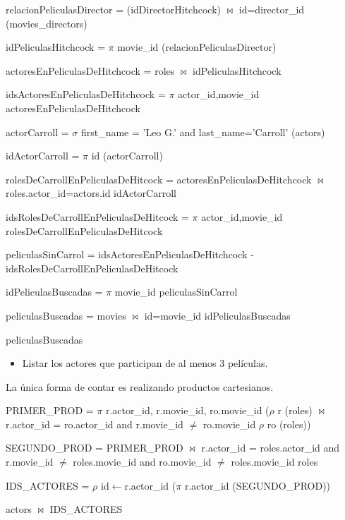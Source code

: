 relacionPeliculasDirector = (idDirectorHitchcock) $\bowtie$ id=director\_id (movies\_directors)

idPeliculasHitchcock = $\pi$ movie\_id (relacionPeliculasDirector)

actoresEnPeliculasDeHitchcock = roles $\bowtie$ idPeliculasHitchcock

idsActoresEnPeliculasDeHitchcock = $\pi$ actor\_id,movie\_id  actoresEnPeliculasDeHitchcock

actorCarroll = $\sigma$ first\_name = 'Leo G.' and last\_name='Carroll' (actors)

idActorCarroll = $\pi$ id (actorCarroll)

rolesDeCarrollEnPeliculasDeHitcock = actoresEnPeliculasDeHitchcock $\bowtie$ roles.actor\_id=actors.id idActorCarroll

idsRolesDeCarrollEnPeliculasDeHitcock = $\pi$ actor\_id,movie\_id rolesDeCarrollEnPeliculasDeHitcock

peliculasSinCarrol = idsActoresEnPeliculasDeHitchcock - idsRolesDeCarrollEnPeliculasDeHitcock

idPeliculasBuscadas = $\pi$ movie\_id peliculasSinCarrol

peliculasBuscadas = movies $\bowtie$ id=movie\_id idPeliculasBuscadas

peliculasBuscadas



\begin{itemize}
\item Listar los actores que participan de al menos 3 películas.
\end{itemize}
La única forma de contar es realizando productos cartesianos.


PRIMER\_PROD = $\pi$ r.actor\_id, r.movie\_id, ro.movie\_id ($\rho$ r (roles) $\bowtie$ r.actor\_id = ro.actor\_id and r.movie\_id $\ne$ ro.movie\_id $\rho$ ro (roles))

SEGUNDO\_PROD = PRIMER\_PROD $\bowtie$ r.actor\_id =  roles.actor\_id and r.movie\_id $\ne$ roles.movie\_id and ro.movie\_id $\ne$ roles.movie\_id roles

IDS\_ACTORES = $\rho$ id$\leftarrow$r.actor\_id ($\pi$ r.actor\_id (SEGUNDO\_PROD))

actors $\bowtie$ IDS\_ACTORES 

\newpage